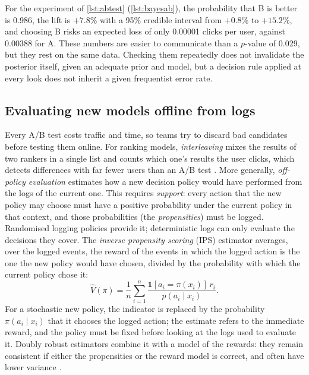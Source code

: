 For the experiment of \cref{lst:abtest} (\cref{lst:bayesab}), the probability that B is better is 0.986, the lift is $+7.8\%$ with a 95\%
credible interval from $+0.8\%$ to $+15.2\%$, and choosing B risks an expected loss of only 0.00001 clicks per user, against 0.00388 for A.
These numbers are easier to communicate than a $p$-value of 0.029, but they rest on the same data. Checking them repeatedly does not invalidate the posterior itself, given an adequate
prior and model, but a decision rule applied at every look does not inherit a given frequentist error rate.

\subsection{Evaluating new models offline from logs}

Every A/B test costs traffic and time, so teams try to discard bad candidates before testing them online. For ranking models,
\emph{interleaving} mixes the results of two rankers in a single list and counts which one's results the user clicks, which detects
differences with far fewer users than an A/B test \citep{chapelle2012large}. More generally, \emph{off-policy evaluation} estimates how a
new decision policy would have performed from the logs of the current one. This requires \emph{support}:
every action that the new policy may choose must have a positive probability under the current policy in that
context, and those probabilities (the \emph{propensities}) must be logged. Randomised logging policies provide it;
deterministic logs can only evaluate the decisions they cover. The \emph{inverse propensity scoring} (IPS) estimator
\citep{horvitz1952generalization,li2011unbiased} averages, over the logged events, the reward of the events in which the logged action is
the one the new policy would have chosen, divided by the probability with which the current policy chose it:
\begin{equation}
  \hat V(\pi)=\frac1n\sum_{i=1}^{n}\frac{\mathbb 1[a_i=\pi(x_i)]\,r_i}{p(a_i\mid x_i)} .
\end{equation}
For a stochastic new policy, the indicator is replaced by the probability $\pi(a_i\mid x_i)$ that it chooses the logged
action; the estimate refers to the immediate reward, and the policy must be fixed before looking at the logs used to
evaluate it. Doubly robust estimators combine it with a model of the rewards: they remain consistent if either the
propensities or the reward model is correct, and often have lower variance \citep{dudik2011doubly}.

